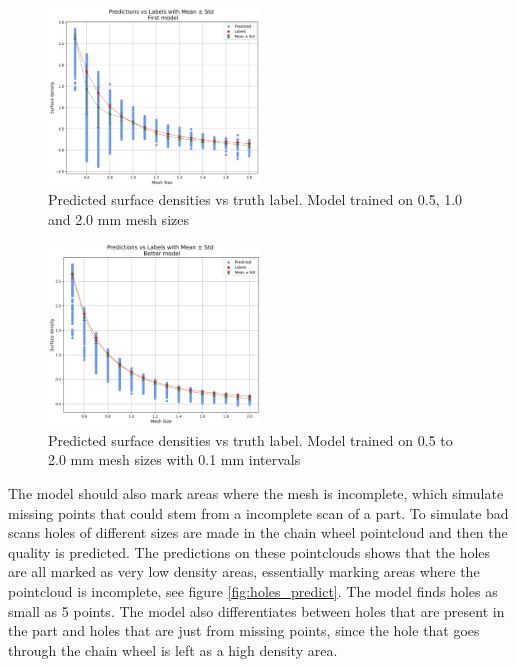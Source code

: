 \begin{figure}[H]
    \centering
    \includegraphics[width=0.5\textwidth]{figures/predict_vs_label_first_lowQ.png}
    \caption{Predicted surface densities vs truth label. Model trained on 0.5, 1.0 and 2.0 mm mesh sizes}
    \label{fig:pred_vs_label_first}
\end{figure}

\begin{figure}[H]
    \centering
    \includegraphics[width=0.5\textwidth]{figures/predict_vs_label_better_lowQ.png}
    \caption{Predicted surface densities vs truth label. Model trained on 0.5 to 2.0 mm mesh sizes with 0.1 mm intervals}
    \label{fig:pred_vs_label_better}
\end{figure}

The model should also mark areas where the mesh is incomplete, which simulate missing points that could stem from a incomplete scan of a part. To simulate bad scans holes of different sizes are made in the chain wheel pointcloud and then the quality is predicted. The predictions on these pointclouds shows that the holes are all marked as very low density areas, essentially marking areas where the pointcloud is incomplete, see figure \ref{fig:holes_predict}. The model finds holes as small as 5 points. The model also differentiates between holes that are present in the part and holes that are just from missing points, since the hole that goes through the chain wheel is left as a high density area.


